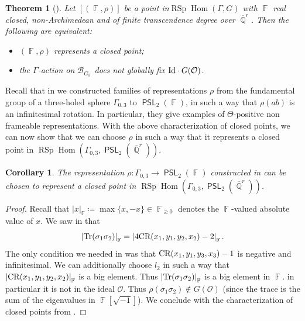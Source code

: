 \documentclass{amsart}
\theoremstyle{plain}
\newtheorem{theorem}[proposition]{Theorem}
\newtheorem{corollary}[proposition]{Corollary}
\theoremstyle{definition}
\DeclareMathOperator{\PSL}{\mathsf{PSL}}
\DeclareMathOperator{\Hom}{Hom}
\DeclareMathOperator{\rsp}{RSp}
\DeclareMathOperator{\Fb}{{\mathbb{F}}}
\DeclareMathOperator{\Qb}{\mathbb{Q}}
\newcommand{\abs}[1]{\left|#1\right|}
\newcommand{\Tr}{\textnormal{Tr}}
\newcommand{\Qbar}{\overline{\Qb}^r}
\newcommand{\1}{\mathbf{1}}
\begin{document}
\begin{theorem}[{\cite[Proposition 6.4]{BurgerIozziParreauPozzetti_RSCCharacterVarieties2}}] \label{thm: Closed point RspHom}
    Let $[(\Fb, \rho)]$ be a point in\break $\rsp\Hom(\Gamma,G)$ with $\Fb$ real closed, non-Archimedean and of finite transcendence degree over $\Qbar$.
    Then the following are equivalent:
    \begin{itemize}
        \item $(\Fb,\rho)$ represents a closed point;
        \item the $\Gamma$-action on $\mathcal{B}_{G_{\Fb}}$ does not globally fix $\textnormal{Id}\cdot G(\mathcal{O})$.
    \end{itemize}
\end{theorem}


Recall that in  we constructed families of representations $\rho$ from the fundamental group of a three-holed sphere $\Gamma_{0,3}$ to $\PSL_2(\Fb)$, in such a way that $\rho(ab)$ is an infinitesimal rotation.
In particular, they give examples of $\Theta$-positive non frameable representations.
With the above characterization of closed points, we can now show that we can choose $\rho$ in such a way that it represents a closed point in $\rsp\Hom(\Gamma_{0,3},\PSL_2(\overline{\Qb}^r))$.

\begin{corollary}
\label{corollary: positive non frameable representation is closed}
The representation $\rho \colon \Gamma_{0,3} \to \PSL_2(\Fb)$ constructed in  can be chosen to represent a closed point in $\rsp\Hom(\Gamma_{0,3},\PSL_2(\overline{\Qb}^r))$.
\end{corollary}
\begin{proof}
    Recall that $\abs{x}_{\Fb}\coloneqq \max \{x,-x\} \in \Fb_{\geq 0}$ denotes the $\Fb$-valued absolute value of $x$.
    We saw in  that 
    \[\abs{\Tr(\sigma_1\sigma_2)}_{\Fb}=\abs{4\textnormal{CR}(x_1,y_1,y_2,x_2)-2}_{\Fb}.\]
    The only condition we needed in  was that $\textnormal{CR}(x_1,y_1,y_3,x_3)-1$ is negative and infinitesimal.
    We can additionally choose $l_2$ in such a way that $\abs{\textnormal{CR}(x_1,y_1,y_2,x_2)}_{\Fb}$ is a big element.
    Thus $\abs{\Tr(\sigma_1 \sigma_2)}_{\Fb}$ is a big element in $\Fb$. in particular it is not in the ideal $\mathcal{O}$.
    Thus $\rho(\sigma_1 \sigma_2) \notin G(\mathcal{O})$ (since the trace is the sum of the eigenvalues in $\Fb[\sqrt{-1}]$).
    We conclude with the characterization of closed points from .
\end{proof}
\end{document}
